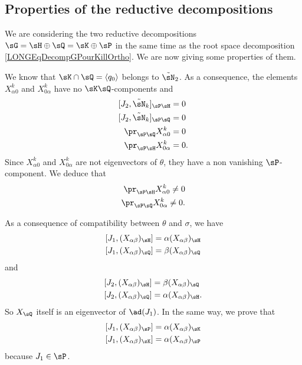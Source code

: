 %
\subsection{Properties of the reductive decompositions}
%
\label{LONGSubSecPropRedDecompQH}

We are considering the two reductive decompositions $\sG=\sH\oplus\sQ=\sK\oplus\sP$ in the same time as the root space decomposition \eqref{LONGEqDecompGPourKillOrtho}. We are now giving some properties of them. 


We know that $\sK\cap\sQ=\langle q_0\rangle$ belongs to $\tilde\sN_2$. As a consequence, the elements $X^k_{\alpha 0}$ and $X^k_{0\alpha}$ have no $\sK\sQ$-components and 
\begin{equation}
	\begin{aligned}[]
		[J_2,\tilde\sN_k]_{\sP\sH}&=0\\
		[J_2,\tilde\sN_k]_{\sP\sQ}&=0\\
		\pr_{\sP\sQ}X_{\alpha 0}^k&=0\\
		\pr_{\sP\sH}X_{0\alpha }^k&=0.
	\end{aligned}
\end{equation}
Since $X^k_{\alpha 0}$ and $X^k_{0\alpha}$ are not  eigenvectors of $\theta$, they have a non vanishing $\sP$-component. We deduce that 
\begin{equation}				\label{LONGEqXalphazeroaduPH}
	\begin{aligned}[]
		\pr_{\sP\sH}X^k_{\alpha 0}\neq 0\\
		\pr_{\sP\sQ}X^k_{0 \alpha }\neq 0.
	\end{aligned}
\end{equation}

As a consequence of compatibility between $\theta$ and $\sigma$, we have
\begin{equation}
	\begin{aligned}[]
		[J_1,(X_{\alpha\beta})_{\sH}]&=\alpha (X_{\alpha\beta})_{\sH}\\
		[J_1,(X_{\alpha\beta})_{\sQ}]&=\beta (X_{\alpha\beta})_{\sQ}
	\end{aligned}
\end{equation}
and
\begin{equation}		\label{LONGSubEqsJdeuxXalphaneta}
	\begin{aligned}[]
		[J_2,(X_{\alpha\beta})_{\sH}]&=\beta (X_{\alpha\beta})_{\sQ}\\
		[J_2,(X_{\alpha\beta})_{\sQ}]&=\alpha (X_{\alpha\beta})_{\sH}.
	\end{aligned}
\end{equation}
So $X_{\sQ}$ itself is an eigenvector of $\ad(J_1)$. In the same way, we prove that
\begin{equation}		\label{LONGEqJUnXabPK}
	\begin{aligned}[]
		[J_1,(X_{\alpha\beta})_{\sP}]=\alpha(X_{\alpha\beta})_{\sK}\\
		[J_1,(X_{\alpha\beta})_{\sK}]=\alpha(X_{\alpha\beta})_{\sP}
	\end{aligned}
\end{equation}
because $J_1\in\sP$.

